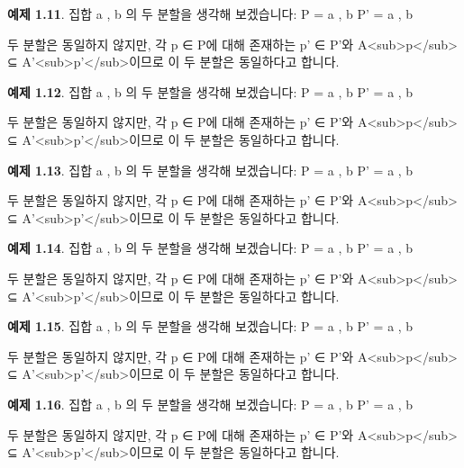 \documentclass[11pt, a4paper, twoside, openany]{book}
\begin{document}
\par\medskip
\textbf{예제 1.11}. 집합 { a , b }의 두 분할을 생각해 보겠습니다:
P = { { a } , { b } }
P' = { { a , b } }

\par\medskip
두 분할은 동일하지 않지만, 각 p ∈ P\hspace{0pt}에 대해 존재하는 p' ∈ P'와 A<sub>p</sub> ⊆ A'<sub>p'</sub>이므로 이 두 분할은 동일하다고 합니다.

\par\medskip
\textbf{예제 1.12}. 집합 { a , b }의 두 분할을 생각해 보겠습니다:
P = { { a } , { b } }
P' = { { a , b } }

\par\medskip
두 분할은 동일하지 않지만, 각 p ∈ P\hspace{0pt}에 대해 존재하는 p' ∈ P'와 A<sub>p</sub> ⊆ A'<sub>p'</sub>이므로 이 두 분할은 동일하다고 합니다.

\par\medskip
\textbf{예제 1.13}. 집합 { a , b }의 두 분할을 생각해 보겠습니다:
P = { { a } , { b } }
P' = { { a , b } }

\par\medskip
두 분할은 동일하지 않지만, 각 p ∈ P\hspace{0pt}에 대해 존재하는 p' ∈ P'와 A<sub>p</sub> ⊆ A'<sub>p'</sub>이므로 이 두 분할은 동일하다고 합니다.

\par\medskip
\textbf{예제 1.14}. 집합 { a , b }의 두 분할을 생각해 보겠습니다:
P = { { a } , { b } }
P' = { { a , b } }

\par\medskip
두 분할은 동일하지 않지만, 각 p ∈ P\hspace{0pt}에 대해 존재하는 p' ∈ P'와 A<sub>p</sub> ⊆ A'<sub>p'</sub>이므로 이 두 분할은 동일하다고 합니다.

\par\medskip
\textbf{예제 1.15}. 집합 { a , b }의 두 분할을 생각해 보겠습니다:
P = { { a } , { b } }
P' = { { a , b } }

\par\medskip
두 분할은 동일하지 않지만, 각 p ∈ P\hspace{0pt}에 대해 존재하는 p' ∈ P'와 A<sub>p</sub> ⊆ A'<sub>p'</sub>이므로 이 두 분할은 동일하다고 합니다.

\par\medskip
\textbf{예제 1.16}. 집합 { a , b }의 두 분할을 생각해 보겠습니다:
P = { { a } , { b } }
P' = { { a , b } }

\par\medskip
두 분할은 동일하지 않지만, 각 p ∈ P\hspace{0pt}에 대해 존재하는 p' ∈ P'와 A<sub>p</sub> ⊆ A'<sub>p'</sub>이므로 이 두 분할은 동일하다고 합니다.
\end{document}
